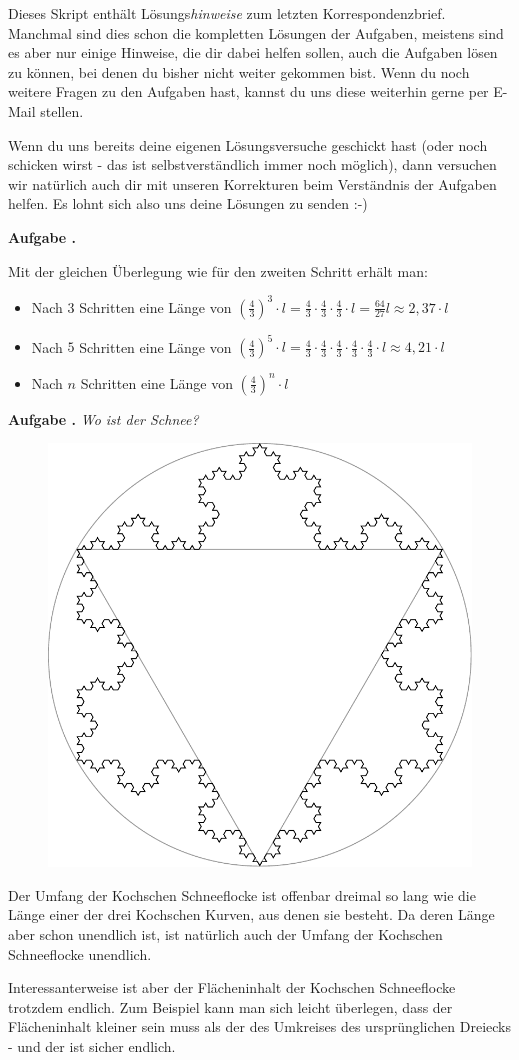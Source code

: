 \documentclass[a4paper,ngerman,12pt]{scrartcl}
\theoremstyle{definition}
\theoremstyle{plain}
\theoremstyle{remark}
\newlength{\aufgabenskip}
\newcounter{aufgabennummer}
\newenvironment{aufgabe}[1]{
  \addtocounter{aufgabennummer}{1}
  \textbf{Aufgabe \theaufgabennummer.} \emph{#1} \par
}{\vspace{\aufgabenskip}}
\begin{document}
Dieses Skript enthält Lösungs\emph{hinweise} zum letzten Korrespondenzbrief. Manchmal sind dies schon die kompletten Lösungen der Aufgaben, meistens sind es aber nur einige Hinweise, die dir dabei helfen sollen, auch die Aufgaben lösen zu können, bei denen du bisher nicht weiter gekommen bist. Wenn du noch weitere Fragen zu den Aufgaben hast, kannst du uns diese weiterhin gerne per E-Mail stellen.

Wenn du uns bereits deine eigenen Lösungsversuche geschickt hast (oder noch schicken wirst - das ist selbstverständlich immer noch möglich), dann versuchen wir natürlich auch dir mit unseren Korrekturen beim Verständnis der Aufgaben helfen. Es lohnt sich also uns deine Lösungen zu senden :-)

\begin{aufgabe}{}
	Mit der gleichen Überlegung wie für den zweiten Schritt erhält man:
	\begin{itemize}
		\item Nach $3$ Schritten eine Länge von $\left(\frac{4}{3}\right)^3\cdot l = \frac{4}{3}\cdot\frac{4}{3}\cdot\frac{4}{3}\cdot l = \frac{64}{27}l \approx 2,37 \cdot l$
		\item Nach $5$ Schritten eine Länge von $\left(\frac{4}{3}\right)^5\cdot l = \frac{4}{3}\cdot\frac{4}{3}\cdot\frac{4}{3}\cdot\frac{4}{3}\cdot\frac{4}{3}\cdot l  \approx 4,21 \cdot l$
		\item Nach $n$ Schritten eine Länge von $\left(\frac{4}{3}\right)^n\cdot l$
	\end{itemize}
\end{aufgabe}

\begin{aufgabe}{Wo ist der Schnee?}
	\begin{figure}\vspace{-1cm}
		\includegraphics[width=.4\textwidth]{Bilder/Schneeflocke-Umkreis.pdf}
	\end{figure}

Der Umfang der Kochschen Schneeflocke ist offenbar dreimal so lang wie die Länge einer der drei Kochschen Kurven, aus denen sie besteht. Da deren Länge aber schon unendlich ist, ist natürlich auch der Umfang der Kochschen Schneeflocke unendlich.

Interessanterweise ist aber der Flächeninhalt der Kochschen Schneeflocke trotzdem endlich. Zum Beispiel kann man sich leicht überlegen, dass der Flächeninhalt kleiner sein muss als der des Umkreises des ursprünglichen Dreiecks - und der ist sicher endlich.

\end{aufgabe}
\end{document}
